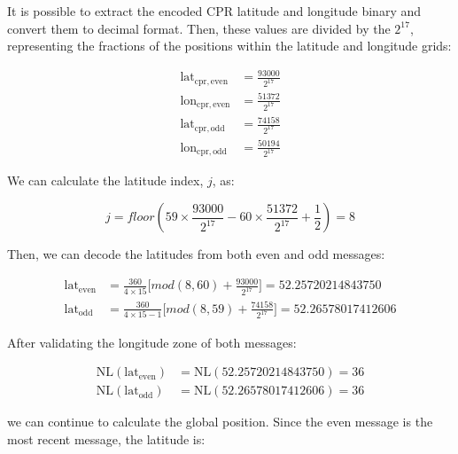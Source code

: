 It is possible to extract the encoded CPR latitude and longitude binary and convert them to decimal format. Then, these values are divided by the $2^{17}$, representing the fractions of the positions within the latitude and longitude grids:

\begin{equation}
  \begin{split}
    \mathrm{lat}_\mathrm{cpr,even} &= \frac{93000}{2^{17}} \\
    \mathrm{lon}_\mathrm{cpr,even} &= \frac{51372}{2^{17}} \\
    \mathrm{lat}_\mathrm{cpr,odd} &=  \frac{74158}{2^{17}} \\
    \mathrm{lon}_\mathrm{cpr,odd} &=  \frac{50194}{2^{17}}
  \end{split}
\end{equation}

We can calculate the latitude index, $j$, as:

\begin{equation}
  j = floor \left( 59 \times \frac{93000}{2^{17}} - 60 \times \frac{51372}{2^{17}} + \frac{1}{2}  \right) = 8
\end{equation}

Then, we can decode the latitudes from both even and odd messages:

\begin{equation}
  \begin{split}
    \mathrm{lat}_\mathrm{even} &= \frac{360}{4 \times 15} \Big[ mod(8, 60) + \frac{93000}{2^{17}} \Big] = 52.25720214843750 \\
    \mathrm{lat}_\mathrm{odd} &= \frac{360}{4 \times 15 - 1} \Big[ mod(8, 59) + \frac{74158}{2^{17}} \Big] = 52.26578017412606
  \end{split}
\end{equation}

After validating the longitude zone of both messages:

\begin{equation}
  \begin{split}
    \mathrm{NL}(\mathrm{lat}_\mathrm{even}) &= \mathrm{NL}(52.25720214843750) = 36 \\
    \mathrm{NL}(\mathrm{lat}_\mathrm{odd}) &= \mathrm{NL}(52.26578017412606) = 36
  \end{split}
\end{equation}

we can continue to calculate the global position. Since the even message is the most recent message, the latitude is:

